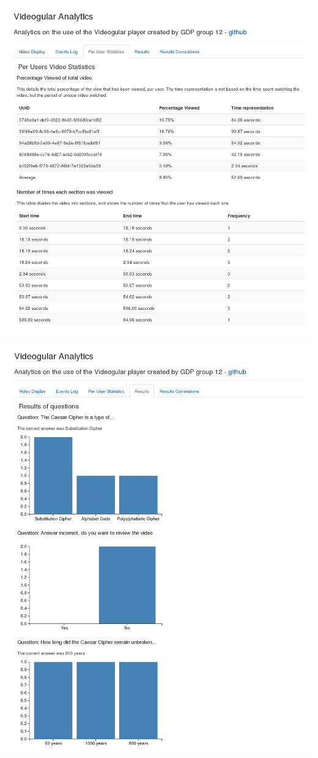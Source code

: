 \includegraphics[width=\textwidth]{screenshots/videogular-analytics-statistics.png}

\includegraphics[width=\textwidth]{screenshots/videogular-analytics-results.png}


